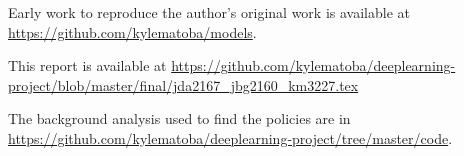 \documentclass[10pt,twocolumn,letterpaper]{article}
\begin{document}
  Early work to reproduce the author's original work is available at \url{https://github.com/kylematoba/models}. 

  This report is available at \url{https://github.com/kylematoba/deeplearning-project/blob/master/final/jda2167_jbg2160_km3227.tex}

  The background analysis used to find the policies are in \url{https://github.com/kylematoba/deeplearning-project/tree/master/code}.

\nocite{Torralba2008}
{\small


}
\end{document}
